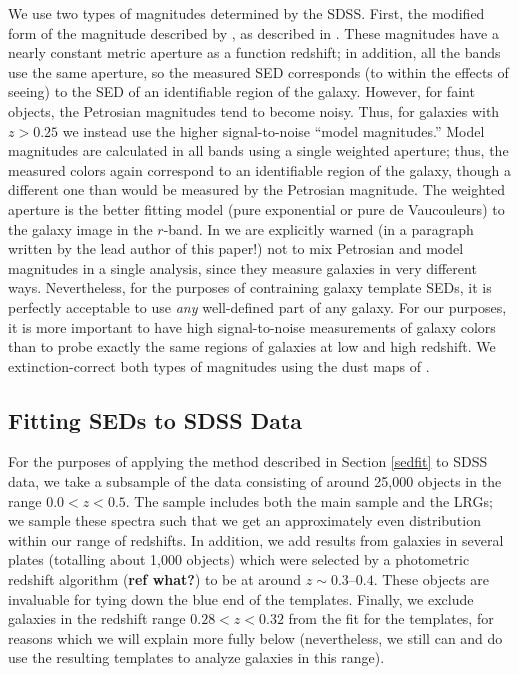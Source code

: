 \documentclass[10pt,preprint]{aastex}
\begin{document}
We use two types of magnitudes determined by the SDSS. First, the
modified form of the magnitude described by \citet{petrosian76a}, as
described in \citet{strauss02a}.  These magnitudes have a nearly
constant metric aperture as a function redshift; in addition, all the
bands use the same aperture, so the measured SED corresponds (to
within the effects of seeing) to the SED of an identifiable region of
the galaxy. However, for faint objects, the Petrosian magnitudes tend
to become noisy. Thus, for galaxies with $z>0.25$ we instead use the
higher signal-to-noise ``model magnitudes.'' Model magnitudes are
calculated in all bands using a single weighted aperture; thus, the
measured colors again correspond to an identifiable region of the
galaxy, though a different one than would be measured by the Petrosian
magnitude. The weighted aperture is the better fitting model (pure
exponential or pure de Vaucouleurs) to the galaxy image in the
$r$-band. In \citet{stoughton01a} we are explicitly warned (in a
paragraph written by the lead author of this paper!)  not to mix
Petrosian and model magnitudes in a single analysis, since they
measure galaxies in very different ways. Nevertheless, for the
purposes of contraining galaxy template SEDs, it is perfectly
acceptable to use {\it any} well-defined part of any galaxy.  For our
purposes, it is more important to have high signal-to-noise
measurements of galaxy colors than to probe exactly the same regions
of galaxies at low and high redshift.  We extinction-correct both
types of magnitudes using the dust maps of \citet{schlegel98a}. 

\subsection{Fitting SEDs to SDSS Data}

For the purposes of applying the method described in Section
\ref{sedfit} to SDSS data, we take a subsample of the data consisting
of around 25,000 objects in the range $0.0<z<0.5$. The sample includes
both the main sample and the LRGs; we sample these spectra such that
we get an approximately even distribution within our range of
redshifts. In addition, we add results from galaxies in several plates
(totalling about 1,000 objects) which were selected by a photometric
redshift algorithm ({\bf ref what?}) to be at around $z\sim
0.3$--$0.4$. These objects are invaluable for tying down the blue end
of the templates. Finally, we exclude galaxies in the redshift range
$0.28 <z<0.32$ from the fit for the templates, for reasons which we
will explain more fully below (nevertheless, we still can and do use
the resulting templates to analyze galaxies in this range).
\end{document}
